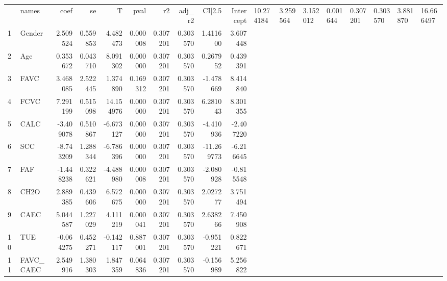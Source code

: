 \begin{tabular}{llrrrrrrrr}
\toprule
 & names & coef & se & T & pval & r2 & adj_r2 & CI[2.5%
 & Intercept & 10.274184 & 3.259564 & 3.152012 & 0.001644 & 0.307201 & 0.303570 & 3.881870 & 16.666497 \\
1 & Gender & 2.509524 & 0.559853 & 4.482473 & 0.000008 & 0.307201 & 0.303570 & 1.411600 & 3.607448 \\
2 & Age & 0.353672 & 0.043710 & 8.091302 & 0.000000 & 0.307201 & 0.303570 & 0.267952 & 0.439391 \\
3 & FAVC & 3.468085 & 2.522445 & 1.374890 & 0.169312 & 0.307201 & 0.303570 & -1.478669 & 8.414840 \\
4 & FCVC & 7.291199 & 0.515098 & 14.154976 & 0.000000 & 0.307201 & 0.303570 & 6.281043 & 8.301355 \\
5 & CALC & -3.409078 & 0.510867 & -6.673127 & 0.000000 & 0.307201 & 0.303570 & -4.410936 & -2.407220 \\
6 & SCC & -8.743209 & 1.288344 & -6.786396 & 0.000000 & 0.307201 & 0.303570 & -11.269773 & -6.216645 \\
7 & FAF & -1.448238 & 0.322621 & -4.488980 & 0.000008 & 0.307201 & 0.303570 & -2.080928 & -0.815548 \\
8 & CH2O & 2.889385 & 0.439606 & 6.572675 & 0.000000 & 0.307201 & 0.303570 & 2.027277 & 3.751494 \\
9 & CAEC & 5.044587 & 1.227029 & 4.111219 & 0.000041 & 0.307201 & 0.303570 & 2.638266 & 7.450908 \\
10 & TUE & -0.064275 & 0.452271 & -0.142117 & 0.887001 & 0.307201 & 0.303570 & -0.951221 & 0.822671 \\
11 & FAVC_CAEC & 2.549916 & 1.380303 & 1.847359 & 0.064836 & 0.307201 & 0.303570 & -0.156989 & 5.256822 \\
\bottomrule
\end{tabular}
